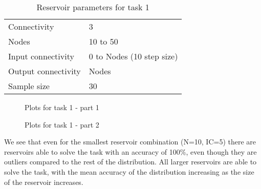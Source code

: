 \begin{table}[ht]
    \centering
    \caption{Reservoir parameters for task 1}
    \label{tab:results:reservoir-parameters-task1}
    \begin{tabular}{ll}
        Connectivity        & 3                         \\
        Nodes               & 10 to 50                  \\
        Input connectivity  & 0 to Nodes (10 step size) \\
        Output connectivity & Nodes                     \\
        Sample size         & 30
    \end{tabular}
\end{table}

\begin{figure*}[ht]
    \centering
    \resizebox{\textwidth}{!}{
        \subfloat[N=10]{
            
        }
        \subfloat[N=15]{
            
        }
    }
    \resizebox{\textwidth}{!}{
        \subfloat[N=20]{
            
        }
        \subfloat[N=25]{
            
        }
    }
    \resizebox{\textwidth}{!}{
        \subfloat[N=30]{
            
        }
        \subfloat[N=35]{
            
        }
    }
    \label{fig:results:task1-ic1}
    \caption{Plots for task 1 - part 1}
\end{figure*}

\begin{figure*}[ht]
    \centering
    \resizebox{\textwidth}{!}{
        \subfloat[N=40]{
            
        }
        \subfloat[N=45]{
            
        }
    }
    \resizebox{0.5\textwidth}{!}{
        \subfloat[N=50]{
            
        }
    }
    \label{fig:results:task1-ic2}
    \caption{Plots for task 1 - part 2}
\end{figure*}

We see that even for the smallest reservoir combination (N=10, IC=5) there are reservoirs able to solve the task with an accuracy of 100\%, even though they are outliers compared to the rest of the distribution.
All larger reservoirs are able to solve the task, with the mean accuracy of the distribution increasing as the size of the reservoir increases.

